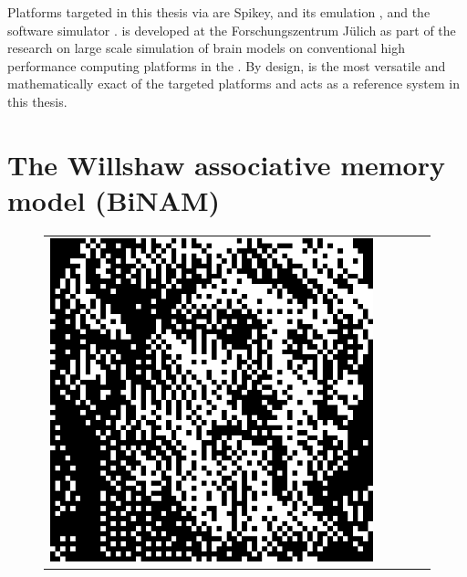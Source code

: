 Platforms targeted in this thesis via \PyNN are Spikey, \NMPM and its emulation \ESS, \NMMC and the software simulator \NEST. \NEST is developed at the Forschungszentrum Jülich as part of the research on large scale simulation of brain models on conventional high performance computing platforms in the \HBP \cite{gewaltig2007nest}. By design, \NEST is the most versatile and mathematically exact of the targeted platforms and acts as a reference system in this thesis.


%
%

\section{The Willshaw associative memory model (BiNAM)}
\label{sec:willshaw_theory}

\begin{figure}
	\footnotesize
	\centering
	\newlength{\tilewidth}
	\setlength{\tilewidth}{0.184\textwidth}
	\setlength{\tabcolsep}{2.75pt}
	\begin{tabular}{c c c c c}%
		\includegraphics[width=\tilewidth,interpolate=false]{media/chp2/associative_memory/hopfield/04_00_orig_scaled_crushed.png}&%

\end{tabular}
\end{figure}
